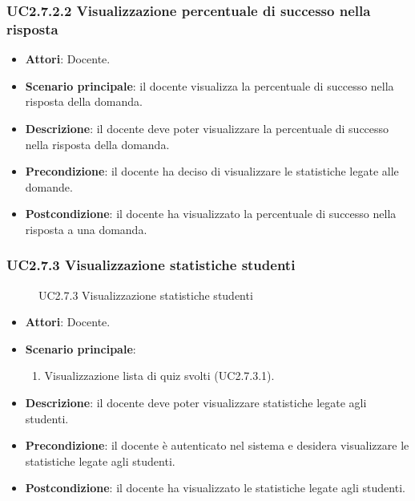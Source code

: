 \subsubsection{UC2.7.2.2 Visualizzazione percentuale di successo nella risposta}
\begin{itemize}
\item \textbf{Attori}: Docente.
\item \textbf{Scenario principale}: il docente visualizza la percentuale di successo nella risposta della domanda.
\item \textbf{Descrizione}: il docente deve poter visualizzare la percentuale di successo nella risposta della domanda.
\item \textbf{Precondizione}: il docente ha deciso di visualizzare le statistiche legate alle domande.
\item \textbf{Postcondizione}: il docente ha visualizzato la percentuale di successo nella risposta a una domanda.
\end{itemize}
\subsubsection{UC2.7.3 Visualizzazione statistiche studenti}
\begin{figure}[H]
\centering
\noindent{}
\caption{UC2.7.3 Visualizzazione statistiche studenti}
\end{figure}
\begin{itemize}
\item \textbf{Attori}: Docente.
\item \textbf{Scenario principale}:
\begin{enumerate}
\item Visualizzazione lista di quiz svolti (UC2.7.3.1).
\end{enumerate}
\item \textbf{Descrizione}:  il docente deve poter visualizzare statistiche legate agli studenti.
\item \textbf{Precondizione}: il docente è autenticato nel sistema e desidera visualizzare le statistiche legate agli studenti.
\item \textbf{Postcondizione}: il docente ha visualizzato le statistiche legate agli studenti.
\end{itemize}

